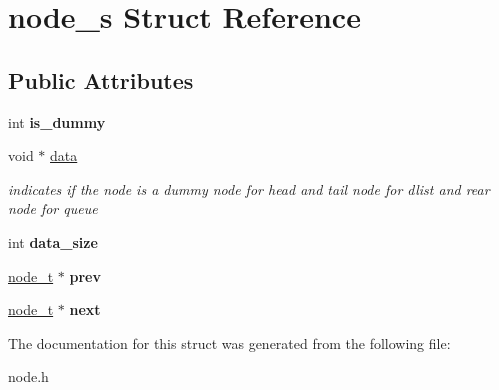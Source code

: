 \hypertarget{structnode__s}{\section{node\-\_\-s Struct Reference}
\label{structnode__s}
}
\subsection*{Public Attributes}
\begin{DoxyCompactItemize}
\item 
\hypertarget{structnode__s_aa299569154c5d785262de31caf489f84}{int {\bfseries is\-\_\-dummy}}\label{structnode__s_aa299569154c5d785262de31caf489f84}

\item 
\hypertarget{structnode__s_ae97adf7c1d652aa8b4fe84cbcdcaea9b}{void $\ast$ \hyperlink{structnode__s_ae97adf7c1d652aa8b4fe84cbcdcaea9b}{data}}\label{structnode__s_ae97adf7c1d652aa8b4fe84cbcdcaea9b}

\begin{DoxyCompactList}\small\item\em indicates if the node is a dummy node for head and tail node for dlist and rear node for queue \end{DoxyCompactList}\item 
\hypertarget{structnode__s_a9c95f32344f20d705d184461ae11d626}{int {\bfseries data\-\_\-size}}\label{structnode__s_a9c95f32344f20d705d184461ae11d626}

\item 
\hypertarget{structnode__s_af63f2c2c1d16037022a14eacd1abf713}{\hyperlink{structnode__s}{node\-\_\-t} $\ast$ {\bfseries prev}}\label{structnode__s_af63f2c2c1d16037022a14eacd1abf713}

\item 
\hypertarget{structnode__s_a5a6b703d87cda099a7dc7dc1dbcae9d7}{\hyperlink{structnode__s}{node\-\_\-t} $\ast$ {\bfseries next}}\label{structnode__s_a5a6b703d87cda099a7dc7dc1dbcae9d7}

\end{DoxyCompactItemize}


The documentation for this struct was generated from the following file\-:\begin{DoxyCompactItemize}
\item 
node.\-h\end{DoxyCompactItemize}
